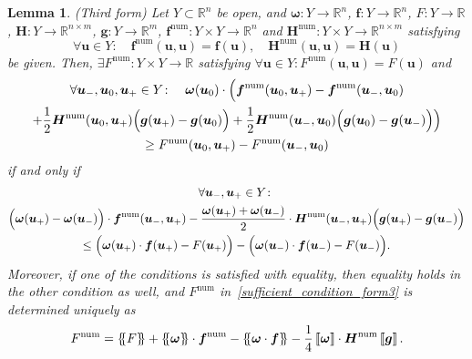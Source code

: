 \documentclass[]{scrartcl}
\newcommand*{\ldblbrace}{\{\mskip-5mu \left \{}
\newcommand*{\rdblbrace}{ \}\mskip-5mu \right \}}
\newcommand{\mean}[1]{\left\ldblbrace #1 \right\rdblbrace}
\renewcommand{\vec}[1]{\boldsymbol{#1}}
\newcommand{\jump}[1]{\left\llbracket #1  \right\rrbracket}
\newtheorem{lemma}[theorem]{Lemma}
\theoremstyle{definition}
\begin{document}
\begin{lemma}{\label{algebraic_lemma_nc_form3}(Third form)}
Let $Y \subset \mathbb{R}^n$ be open, and $\vec{\omega}\colon Y \to \mathbb{R}^n$, $\vec{f}\colon Y \to \mathbb{R}^n$, $F\colon Y \to \mathbb{R}$, $\vec{H}\colon Y \to \mathbb{R}^{n \times m}$,  $\vec{g}\colon Y \to \mathbb{R}^m$, $\vec{f}^{\mathrm{num}}\colon Y \times Y \to \mathbb{R}^{n}$ and $\vec{H}^{\mathrm{num}}\colon Y \times Y \to \mathbb{R}^{n \times m}$ satisfying
\begin{equation}
\forall \vec{u} \in Y\colon \quad \vec{f}^\mathrm{num}(\vec{u},\vec{u}) = \vec{f}(\vec{u}), \quad \vec{H}^{\mathrm{num}}(\vec{u},\vec{u}) = \vec{H}(\vec{u})
\end{equation}
be given.
Then, $\exists F^\mathrm{num}\colon Y \times Y \to \mathbb{R}$ satisfying  $\forall \vec{u} \in Y\colon F^\mathrm{num}(\vec{u},\vec{u}) = F(\vec{u})$ and
\begin{multline}
    \forall \vec{u}_-, \vec{u}_0, \vec{u}_+ \in Y\colon
    \quad
    \vec{\omega}(\vec{u}_0) \cdot \Bigl (
        \vec{f}^\mathrm{num}(\vec{u}_0, \vec{u}_+) - \vec{f}^\mathrm{num}(\vec{u}_-, \vec{u}_0)
        \\
        + \frac{1}{2}\vec{H}^\mathrm{num} (\vec{u}_0, \vec{u}_+) \Bigl ( \vec{g}(\vec{u}_+) - \vec{g}(\vec{u}_0) \Bigr )
        + \frac{1}{2}\vec{H}^\mathrm{num}(\vec{u}_-, \vec{u}_0) \Bigl (\vec{g}(\vec{u}_0) - \vec{g}(\vec{u}_-) \Bigr )
    \Bigr )
    \\
    \geq
    F^\mathrm{num}(\vec{u}_0, \vec{u}_+) - F^\mathrm{num}(\vec{u}_-, \vec{u}_0)
    \label{sufficient_condition_form3}
\end{multline}
if and only if
\begin{multline}
    \forall \vec{u}_-, \vec{u}_+ \in Y\colon
    \\
    \Bigl (\vec{\omega}(\vec{u}_+) - \vec{\omega}(\vec{u}_-) \Bigr )
    \cdot \vec{f}^\mathrm{num}(\vec{u}_-, \vec{u}_+)
    - \frac{\vec{\omega}(\vec{u}_+) + \vec{\omega}(\vec{u}_-)}{2}
    \cdot \vec{H}^{\mathrm{num}}(\vec{u}_-, \vec{u}_+)
    \Bigl ( \vec{g}(\vec{u}_+) - \vec{g}(\vec{u}_-) \Bigr )
    \\
    \leq
    \Bigl (\vec{\omega}(\vec{u}_+) \cdot \vec{f}(\vec{u}_+) - F(\vec{u}_+) \Bigr )
    - \Bigl (\vec{\omega}(\vec{u}_-) \cdot \vec{f}(\vec{u}_-) - F(\vec{u}_-) \Bigr ).
\label{necessary_condition_form3}
\end{multline}
Moreover, if one of the conditions is satisfied with equality, then equality holds in the other condition as well, and $F^{\mathrm{num}}$ in~\eqref{sufficient_condition_form3} is determined uniquely as
\begin{equation}
F^{\mathrm{num}} = \mean{F} + \mean{\vec{\omega}}\cdot \vec{f}^{\mathrm{num}}  -\mean{\vec{\omega} \cdot \vec{f}}   - \frac{1}{4} \jump{\vec{\omega}} \cdot \vec{H}^{\mathrm{num}}\jump{\vec{g}}.
\label{F_num_form3}
\end{equation}
\end{lemma}
\end{document}
